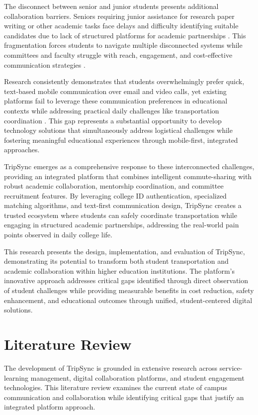\documentclass[conference]{IEEEtran}
\begin{document}
The disconnect between senior and junior students presents additional collaboration barriers. Seniors requiring junior assistance for research paper writing or other academic tasks face delays and difficulty identifying suitable candidates due to lack of structured platforms for academic partnerships \cite{ref9}\cite{ref10}. This fragmentation forces students to navigate multiple disconnected systems while committees and faculty struggle with reach, engagement, and cost-effective communication strategies \cite{ref11}\cite{ref12}.

Research consistently demonstrates that students overwhelmingly prefer quick, text-based mobile communication over email and video calls, yet existing platforms fail to leverage these communication preferences in educational contexts while addressing practical daily challenges like transportation coordination \cite{ref13}\cite{ref14}. This gap represents a substantial opportunity to develop technology solutions that simultaneously address logistical challenges while fostering meaningful educational experiences through mobile-first, integrated approaches.

TripSync emerges as a comprehensive response to these interconnected challenges, providing an integrated platform that combines intelligent commute-sharing with robust academic collaboration, mentorship coordination, and committee recruitment features. By leveraging college ID authentication, specialized matching algorithms, and text-first communication design, TripSync creates a trusted ecosystem where students can safely coordinate transportation while engaging in structured academic partnerships, addressing the real-world pain points observed in daily college life.

This research presents the design, implementation, and evaluation of TripSync, demonstrating its potential to transform both student transportation and academic collaboration within higher education institutions. The platform's innovative approach addresses critical gaps identified through direct observation of student challenges while providing measurable benefits in cost reduction, safety enhancement, and educational outcomes through unified, student-centered digital solutions.

\section{Literature Review}

The development of TripSync is grounded in extensive research across service-learning management, digital collaboration platforms, and student engagement technologies. This literature review examines the current state of campus communication and collaboration while identifying critical gaps that justify an integrated platform approach.
\end{document}
